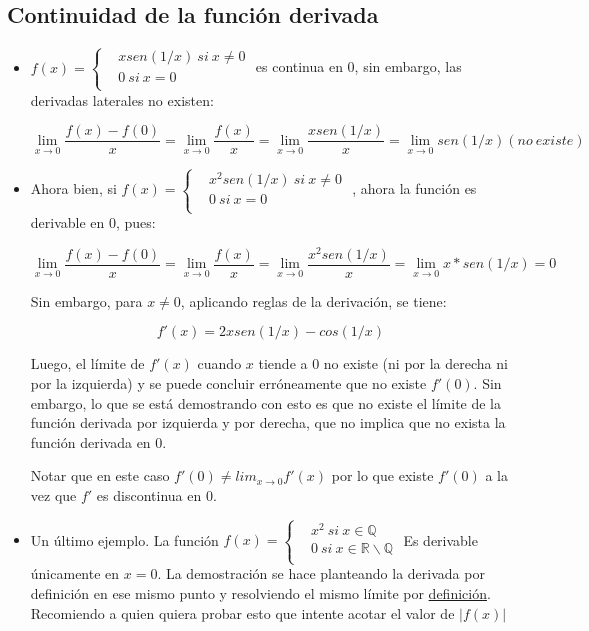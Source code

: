 \documentclass{report}
\begin{document}
		\subsection{Continuidad de la función derivada}
			\begin{itemize}
				\item $f(x)=\begin{cases}
					&xsen(1/x) \ si\ x\neq0 \\
					&0 \ si\ x=0 \\
				\end{cases}$ es continua en 0, sin embargo, las derivadas laterales no existen:
			
				$$\lim_{x \to 0}{\frac{f(x)-f(0)}{x}} = \lim_{x \to 0}{\frac{f(x)}{x}} = \lim_{x \to 0}{\frac{xsen(1/x)}{x}} = \lim_{x \to 0}{sen(1/x)} (no \ existe)$$
				
				\item Ahora bien, si $f(x)=\begin{cases}
					&x^2sen(1/x) \ si\ x\neq0 \\
					&0 \ si\ x=0 \\
				\end{cases}$ , ahora la función es derivable en 0, pues:
			
				$$\lim_{x \to 0}{\frac{f(x)-f(0)}{x}} = \lim_{x \to 0}{\frac{f(x)}{x}} = \lim_{x \to 0}{\frac{x^2sen(1/x)}{x}} = \lim_{x \to 0}{x*sen(1/x)} = 0$$
				
				Sin embargo, para $x\neq 0$, aplicando reglas de la derivación, se tiene:
				
					$$f'(x)=2xsen(1/x)-cos(1/x)$$
					
				Luego, el límite de $f'(x)$ cuando $x$ tiende a 0 no existe (ni por la derecha ni por la izquierda) y se puede concluir erróneamente que no existe $f'(0)$. Sin embargo, lo que se está demostrando con esto es que no existe el límite de la función derivada por izquierda y por derecha, que no implica que no exista la función derivada en 0.
				
				Notar que en este caso $f'(0) \neq lim_{x\to 0}{f'(x)}$ por lo que existe $f'(0)$ a la vez que $f'$ es discontinua en 0.
				
				\item Un último ejemplo. La función $f(x)= \begin{cases}
					&x^2 \ si\ x\in\mathbb{Q} \\
					&0 \ si\ x\in\mathbb{R}\backslash \mathbb{Q} \\
				\end{cases}$			
				Es derivable únicamente en $x=0$. La demostración se hace planteando la derivada por definición en ese mismo punto y resolviendo el mismo límite por \hyperref[definicion1]{definición}. Recomiendo a quien quiera probar esto que intente acotar el valor de $|f(x)|$
					
			\end{itemize}
		
\end{document}
